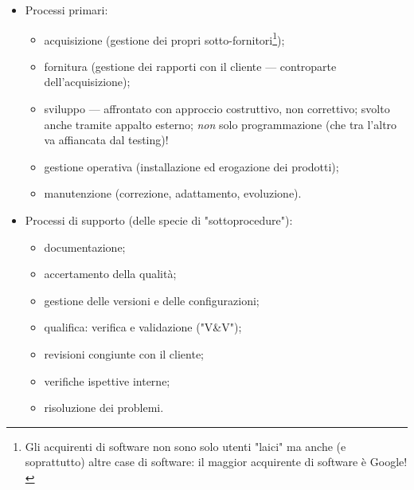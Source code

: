 \documentclass[a4paper]{article}
\begin{document}
	\begin{itemize}
		
			
	\item Processi primari:
				
	\begin{itemize}
		
					
	\item acquisizione (gestione dei propri sotto-fornitori\footnote{Gli acquirenti di software non sono solo utenti "laici" ma anche (e soprattutto) altre case di software: il maggior acquirente di software è Google!});
					
	\item fornitura (gestione dei rapporti con il cliente — controparte dell'acquisizione);
					
	\item sviluppo — affrontato con approccio costruttivo, non correttivo; svolto anche tramite appalto esterno; \emph{non} solo programmazione (che tra l'altro va affiancata dal testing)!
					
	\item gestione operativa (installazione ed erogazione dei prodotti);
					
	\item manutenzione (correzione, adattamento, evoluzione).
				
	\end{itemize}

			
			
	\item Processi di supporto (delle specie di "sottoprocedure"):
				
	\begin{itemize}
		
					
	\item documentazione;
					
	\item accertamento della qualità;
					
	\item gestione delle versioni e delle configurazioni;
					
	\item qualifica: verifica e validazione ("V\&{}V");
					
	\item revisioni congiunte con il cliente;
					
	\item verifiche ispettive interne;
					
	\item risoluzione dei problemi.
				

\end{itemize}
\end{itemize}
\end{document}
